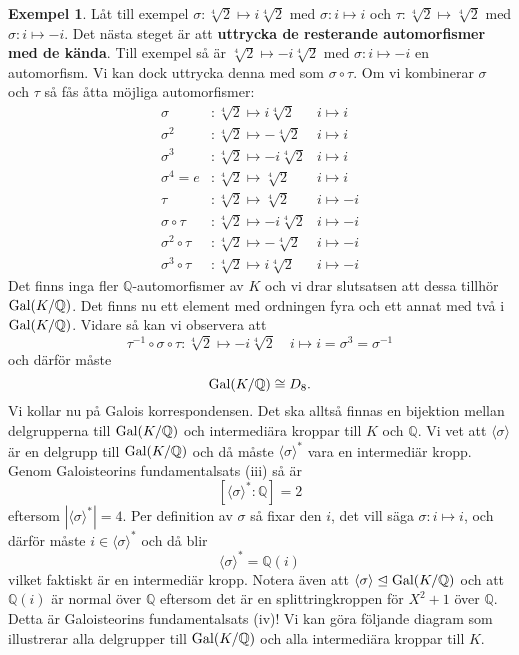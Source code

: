 \documentclass{article}
\newcommand{\gal}[0]{\textnormal{Gal}}
\theoremstyle{definition}
\newtheorem{exmp}[thm]{Exempel}
\begin{document}
\begin{exmp}
  Låt till exempel 
  $\sigma: \sqrt[4]{2} \mapsto i \sqrt[4]{2}$ med $\sigma: i \mapsto i$ och $\tau: \sqrt[4]{2} \mapsto \sqrt[4]{2}$ med $\sigma: i \mapsto -i$.
  Det nästa steget är att \textbf{uttrycka de resterande automorfismer med de kända}. Till exempel så är $\sqrt[4]{2} \mapsto -i\sqrt[4]{2}$ med 
  $\sigma: i \mapsto -i$ en automorfism. Vi kan dock uttrycka denna med som $\sigma \circ\tau$. Om vi kombinerar $\sigma$ och $\tau$ så fås 
  åtta möjliga automorfismer: 
  \begin{align*}
    \sigma &: \sqrt[4]{2} \mapsto i\sqrt[4]{2}        & i \mapsto i \\
    \sigma^2 &: \sqrt[4]{2} \mapsto -\sqrt[4]{2}  & i \mapsto i \\
    \sigma^3 &: \sqrt[4]{2} \mapsto -i\sqrt[4]{2}  & i \mapsto i \\
    \sigma^4  = e &: \sqrt[4]{2} \mapsto \sqrt[4]{2}        & i \mapsto i \\
    \tau &: \sqrt[4]{2} \mapsto \sqrt[4]{2}                 & i \mapsto -i \\
    \sigma \circ \tau &: \sqrt[4]{2} \mapsto -i\sqrt[4]{2}  & i \mapsto -i \\
    \sigma^2 \circ \tau &: \sqrt[4]{2} \mapsto -\sqrt[4]{2} & i \mapsto -i \\
    \sigma^3 \circ \tau &: \sqrt[4]{2} \mapsto i\sqrt[4]{2} & i \mapsto -i
  \end{align*}
  Det finns inga fler $\mathbb{Q}$-automorfismer av $K$ och vi drar slutsatsen att dessa tillhör $\gal(K/\mathbb{Q})$. 
  Det finns nu ett element med ordningen fyra och ett annat med två i $\gal(K/\mathbb{Q})$. Vidare så kan vi observera att 
  \[\tau^{-1} \circ \sigma \circ \tau: \sqrt[4]{2} \mapsto -i\sqrt[4]{2} \quad i \mapsto i = \sigma^3 = \sigma^{-1}\]
  och därför måste 
  \[\gal(K/\mathbb{Q}) \cong D_8.\]
  Vi kollar nu på Galois korrespondensen. Det ska alltså finnas en bijektion mellan delgrupperna till $\gal(K/\mathbb{Q})$ och intermediära kroppar till $K$
  och $\mathbb{Q}$. Vi vet att $\langle \sigma \rangle$ är en delgrupp till $\gal(K/\mathbb{Q})$ och då måste  $\langle \sigma \rangle^*$ vara en 
  intermediär kropp. Genom Galoisteorins fundamentalsats (iii) så är 
  \[ [\langle \sigma \rangle^*: \mathbb{Q}] = 2 \]
  eftersom $|\langle \sigma \rangle^*| = 4$. Per definition av $\sigma$ så fixar den $i$, det vill säga $\sigma: i \mapsto i$, och därför måste
  $i \in \langle \sigma \rangle^*$ och då blir 
  \[\langle \sigma \rangle^* = \mathbb{Q}(i)\]
  vilket faktiskt är en intermediär kropp.
  Notera även att $\langle \sigma \rangle \trianglelefteq \gal(K/\mathbb{Q})$ och att $\mathbb{Q}(i)$ är normal över $\mathbb{Q}$ eftersom 
  det är en splittringkroppen för $X^2 + 1$ över $\mathbb{Q}$. Detta är Galoisteorins fundamentalsats (iv)! Vi kan göra följande diagram som 
  illustrerar alla delgrupper till $\gal(K/\mathbb{Q})$ och alla intermediära kroppar till $K$.


\end{exmp}
\end{document}
